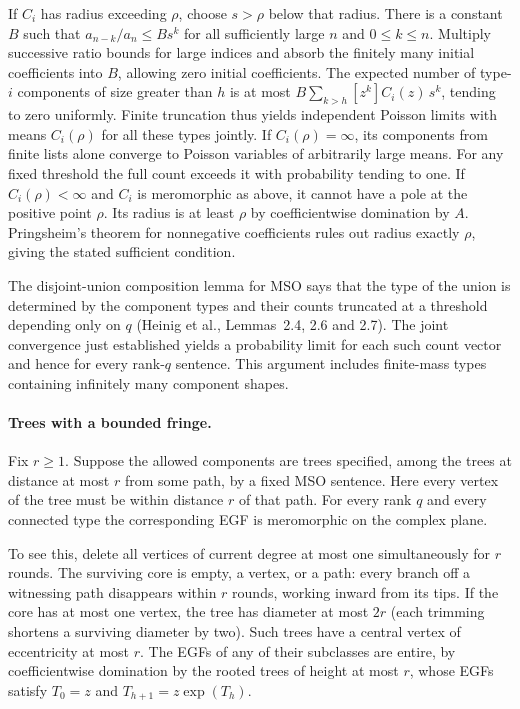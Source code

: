 \documentclass[11pt]{article}
\begin{document}
If $C_i$ has radius exceeding $\rho$, choose $s>\rho$ below that radius. There is a constant $B$ such that $a_{n-k}/a_n\le B s^k$ for all sufficiently large $n$ and $0\le k\le n$. Multiply successive ratio bounds for large indices and absorb the finitely many initial coefficients into $B$, allowing zero initial coefficients. The expected number of type-$i$ components of size greater than $h$ is at most $B\sum_{k>h}[z^k]C_i(z)\,s^k$, tending to zero uniformly. Finite truncation thus yields independent Poisson limits with means $C_i(\rho)$ for all these types jointly. If $C_i(\rho)=\infty$, its components from finite lists alone converge to Poisson variables of arbitrarily large means. For any fixed threshold the full count exceeds it with probability tending to one. If $C_i(\rho)<\infty$ and $C_i$ is meromorphic as above, it cannot have a pole at the positive point $\rho$. Its radius is at least $\rho$ by coefficientwise domination by $A$. Pringsheim's theorem for nonnegative coefficients rules out radius exactly $\rho$, giving the stated sufficient condition.

The disjoint-union composition lemma for MSO says that the type of the union is determined by the component types and their counts truncated at a threshold depending only on $q$ (Heinig et al., Lemmas~2.4, 2.6 and 2.7). The joint convergence just established yields a probability limit for each such count vector and hence for every rank-$q$ sentence. This argument includes finite-mass types containing infinitely many component shapes.

\paragraph{Trees with a bounded fringe.} Fix $r\ge1$. Suppose the allowed components are trees specified, among the trees at distance at most $r$ from some path, by a fixed MSO sentence. Here every vertex of the tree must be within distance $r$ of that path. For every rank $q$ and every connected type the corresponding EGF is meromorphic on the complex plane.

To see this, delete all vertices of current degree at most one simultaneously for $r$ rounds. The surviving core is empty, a vertex, or a path: every branch off a witnessing path disappears within $r$ rounds, working inward from its tips. If the core has at most one vertex, the tree has diameter at most $2r$ (each trimming shortens a surviving diameter by two). Such trees have a central vertex of eccentricity at most $r$. The EGFs of any of their subclasses are entire, by coefficientwise domination by the rooted trees of height at most $r$, whose EGFs satisfy $T_0=z$ and $T_{h+1}=z\exp(T_h)$.
\end{document}
